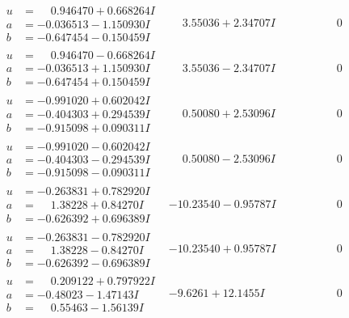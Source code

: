 \documentclass[1p]{elsarticle_modified}
\theoremstyle{definition}
\begin{document}
$$\begin{array}{c|c|c}
\begin{aligned}
u &= \phantom{-}0.946470 + 0.668264 I \\
a &= -0.036513 - 1.150930 I \\
b &= -0.647454 - 0.150459 I\end{aligned}
 & \phantom{-}3.55036 + 2.34707 I & \phantom{-0.000000 } 0 \\ \hline\begin{aligned}
u &= \phantom{-}0.946470 - 0.668264 I \\
a &= -0.036513 + 1.150930 I \\
b &= -0.647454 + 0.150459 I\end{aligned}
 & \phantom{-}3.55036 - 2.34707 I & \phantom{-0.000000 } 0 \\ \hline\begin{aligned}
u &= -0.991020 + 0.602042 I \\
a &= -0.404303 + 0.294539 I \\
b &= -0.915098 + 0.090311 I\end{aligned}
 & \phantom{-}0.50080 + 2.53096 I & \phantom{-0.000000 } 0 \\ \hline\begin{aligned}
u &= -0.991020 - 0.602042 I \\
a &= -0.404303 - 0.294539 I \\
b &= -0.915098 - 0.090311 I\end{aligned}
 & \phantom{-}0.50080 - 2.53096 I & \phantom{-0.000000 } 0 \\ \hline\begin{aligned}
u &= -0.263831 + 0.782920 I \\
a &= \phantom{-}1.38228 + 0.84270 I \\
b &= -0.626392 + 0.696389 I\end{aligned}
 & -10.23540 - 0.95787 I & \phantom{-0.000000 } 0 \\ \hline\begin{aligned}
u &= -0.263831 - 0.782920 I \\
a &= \phantom{-}1.38228 - 0.84270 I \\
b &= -0.626392 - 0.696389 I\end{aligned}
 & -10.23540 + 0.95787 I & \phantom{-0.000000 } 0 \\ \hline\begin{aligned}
u &= \phantom{-}0.209122 + 0.797922 I \\
a &= -0.48023 - 1.47143 I \\
b &= \phantom{-}0.55463 - 1.56139 I\end{aligned}
 & -9.6261 + 12.1455 I & \phantom{-0.000000 } 0\\

\end{array}$$
\end{document}
